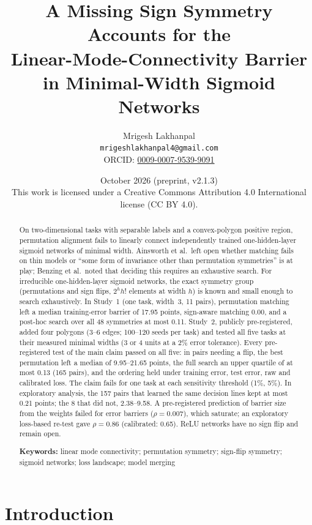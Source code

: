 \documentclass[11pt]{article}
\title{\textbf{A Missing Sign Symmetry Accounts for the\\ Linear-Mode-Connectivity Barrier in Minimal-Width Sigmoid Networks}}
\author{Mrigesh Lakhanpal\\
\small \texttt{mrigeshlakhanpal4@gmail.com}\\
\small ORCID: \href{https://orcid.org/0009-0007-9539-9091}{0009-0007-9539-9091}}
\date{October 2026 \quad (preprint, v2.1.3)\\[2pt] \footnotesize This work is licensed under a Creative Commons Attribution 4.0 International license (CC BY 4.0).}
\begin{document}
\maketitle
\thispagestyle{empty}

\begin{abstract}
\noindent
On two-dimensional tasks with separable labels and a convex-polygon positive region, permutation alignment fails to linearly connect independently trained one-hidden-layer sigmoid networks of minimal width. Ainsworth et al.\ left open whether matching fails on thin models or ``some form of invariance other than permutation symmetries'' is at play; Benzing et al.\ noted that deciding this requires an exhaustive search. For irreducible one-hidden-layer sigmoid networks, the exact symmetry group (permutations and sign flips, $2^h h!$ elements at width $h$) is known and small enough to search exhaustively. In Study~1 (one task, width~3, 11 pairs), permutation matching left a median training-error barrier of 17.95 points, sign-aware matching 0.00, and a post-hoc search over all 48 symmetries at most 0.11. Study~2, publicly pre-registered, added four polygons (3--6 edges; 100--120 seeds per task) and tested all five tasks at their measured minimal widths (3 or 4 units at a 2\% error tolerance). Every pre-registered test of the main claim passed on all five: in pairs needing a flip, the best permutation left a median of 9.95--21.65 points, the full search an upper quartile of at most 0.13 (165 pairs), and the ordering held under training error, test error, raw and calibrated loss. The claim fails for one task at each sensitivity threshold (1\%, 5\%). In exploratory analysis, the 157 pairs that learned the same decision lines kept at most 0.21 points; the 8 that did not, 2.38--9.58. A pre-registered prediction of barrier size from the weights failed for error barriers ($\rho = 0.007$), which saturate; an exploratory loss-based re-test gave $\rho = 0.86$ (calibrated: 0.65). ReLU networks have no sign flip and remain open.
\par\medskip\noindent\textbf{Keywords:} linear mode connectivity; permutation symmetry; sign-flip symmetry; sigmoid networks; loss landscape; model merging
\end{abstract}

\section{Introduction}
\end{document}
